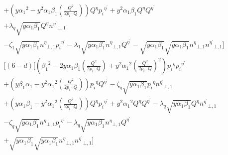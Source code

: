 \begin{equation}
\begin{split}
+(y{\alpha_1}^2 -y^2\alpha_1\beta_1(\frac{Q^2}{2p_i \cdot Q})) {Q}^{\eta}{p_i}^{{\eta}^{\prime}}+y^2\alpha_1\beta_1{Q}^{\eta}{Q}^{{\eta}^{\prime}}\\+\lambda_q\sqrt{y\alpha_1\beta_1}{Q}^{\eta}{n^{{\eta}^{\prime}}}_{\bot,1}\\
-\zeta_1\sqrt{y\alpha_1\beta_1} {n^{{\eta}}}_{\bot,1}{p_i}^{{\eta}^{\prime}}-\lambda_1\sqrt{y\alpha_1\beta_1}{n^{{\eta}}}_{\bot,1}{Q}^{{\eta}^{\prime}}-\sqrt{y\alpha_1\beta_1}\sqrt{y\alpha_1\beta_1}{n^{{\eta}}}_{\bot,1}{n^{{\eta}^{\prime}}}_{\bot,1}]\\
[(6-d)[({\beta_1}^2 -2y\alpha_1\beta_1 (\frac{Q^2}{2p_i \cdot Q})+ y^2{\alpha_1}^2 (\frac{Q^2}{2p_i \cdot Q})^2) {p_i}^{\eta}{p_i}^{{\eta}^{\prime}}\\+(y\beta_1\alpha_1 -y^2{\alpha_1}^2(\frac{Q^2}{2p_i \cdot Q})){p_i}^{\eta}{Q}^{{\eta}^{\prime}}-\zeta_q\sqrt{y\alpha_1\beta_1}{p_i}^{\eta}{n^{{\eta}^{\prime}}}_{\bot,1}\\
+(y\alpha_1\beta_1 -y^2{\alpha_1}^2 (\frac{Q^2}{2p_i \cdot Q})) {Q}^{\eta}{p_i}^{{\eta}^{\prime}}+y^2{\alpha_1}^2{Q}^{\eta}{Q}^{{\eta}^{\prime}}-\lambda_q\sqrt{y\alpha_1\beta_1}{Q}^{\eta}{n^{{\eta}^{\prime}}}_{\bot,1}\\
-\zeta_q\sqrt{y\alpha_1\beta_1} {n^{{\eta}}}_{\bot,1}{p_i}^{{\eta}^{\prime}}-\lambda_q\sqrt{y\alpha_1\beta_1}{n^{{\eta}}}_{\bot,1}{Q}^{{\eta}^{\prime}}\\+\sqrt{y\alpha_1\beta_1}\sqrt{y\alpha_1\beta_1}{n^{{\eta}}}_{\bot,1}{n^{{\eta}^{\prime}}}_{\bot,1}]\\
\end{split}
\end{equation}



